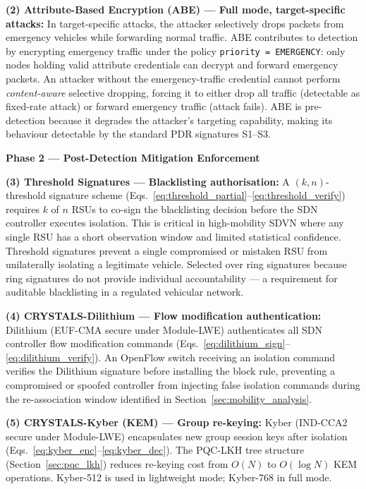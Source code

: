 \documentclass[12pt, a4paper]{report}
\newcommand{\mypar}{\vspace{0.8em}\noindent}
\begin{document}
\textbf{(2) Attribute-Based Encryption (ABE) --- Full mode, target-specific attacks:}
In target-specific attacks, the attacker selectively drops packets from emergency
vehicles while forwarding normal traffic. ABE contributes to detection by
encrypting emergency traffic under the policy \texttt{priority = EMERGENCY}: only
nodes holding valid attribute credentials can decrypt and forward emergency packets.
An attacker without the emergency-traffic credential cannot perform
\emph{content-aware} selective dropping, forcing it to either drop all traffic
(detectable as fixed-rate attack) or forward emergency traffic (attack fails).
ABE is pre-detection because it degrades the attacker's targeting capability,
making its behaviour detectable by the standard PDR signatures S1--S3.

\mypar
\textbf{Phase 2 --- Post-Detection Mitigation Enforcement}

\textbf{(3) Threshold Signatures --- Blacklisting authorisation:}
A $(k,n)$-threshold signature scheme (Eqs.~\eqref{eq:threshold_partial}--\eqref{eq:threshold_verify})
requires $k$ of $n$ RSUs to co-sign the blacklisting decision before the SDN
controller executes isolation. This is critical in high-mobility SDVN where any
single RSU has a short observation window and limited statistical confidence.
Threshold signatures prevent a single compromised or mistaken RSU from unilaterally
isolating a legitimate vehicle. Selected over ring signatures because ring
signatures do not provide individual accountability --- a requirement for auditable
blacklisting in a regulated vehicular network.

\textbf{(4) CRYSTALS-Dilithium --- Flow modification authentication:}
Dilithium (EUF-CMA secure under Module-LWE) authenticates all SDN controller flow
modification commands (Eqs.~\eqref{eq:dilithium_sign}--\eqref{eq:dilithium_verify}).
An OpenFlow switch receiving an isolation command verifies the Dilithium signature
before installing the block rule, preventing a compromised or spoofed controller
from injecting false isolation commands during the re-association window identified
in Section~\ref{sec:mobility_analysis}.

\textbf{(5) CRYSTALS-Kyber (KEM) --- Group re-keying:}
Kyber (IND-CCA2 secure under Module-LWE) encapsulates new group session keys after
isolation (Eqs.~\eqref{eq:kyber_enc}--\eqref{eq:kyber_dec}). The PQC-LKH tree
structure (Section~\ref{sec:pqc_lkh}) reduces re-keying cost from $O(N)$ to
$O(\log N)$ KEM operations. Kyber-512 is used in lightweight mode;
Kyber-768 in full mode.
\end{document}
